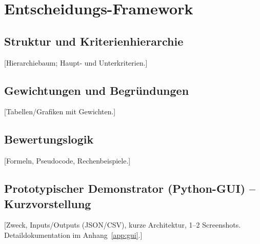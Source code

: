 \chapter{Entscheidungs-Framework}

\section{Struktur und Kriterienhierarchie}
[Hierarchiebaum; Haupt- und Unterkriterien.]

\section{Gewichtungen und Begründungen}
[Tabellen/Grafiken mit Gewichten.]

\section{Bewertungslogik}
[Formeln, Pseudocode, Rechenbeispiele.]

\section{Prototypischer Demonstrator (Python-GUI) – Kurzvorstellung}
[Zweck, Inputs/Outputs (JSON/CSV), kurze Architektur, 1–2 Screenshots.
Detaildokumentation im Anhang~\ref{app:gui}.]
